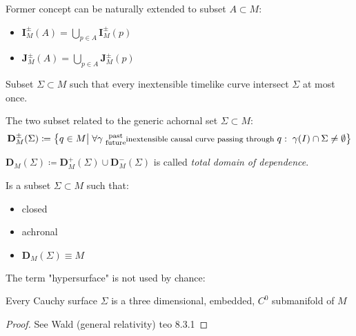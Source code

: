 \documentclass[a4paper,12pt]{scrartcl}    %
\begin{document}
	\begin{notationfix}
		Former concept can be naturally extended to subset $A \subset M$:
			\begin{itemize}
				\item $\mathbf{I}_M^\pm(A) = \bigcup_{p\in A} \mathbf{I}_M^\pm(p) $
				\item $\mathbf{J}_M^\pm(A) = \bigcup_{p\in A} \mathbf{J}_M^\pm(p) $
			\end{itemize}
	\end{notationfix}

	\begin{definition}
		Subset $\Sigma \subset M$ such that every inextensible timelike curve intersect $\Sigma$ at most once.
	\end{definition}

	\begin{definition}
		The two subset related to the generic achornal set $\Sigma \subset M$:
		\begin{displaymath}		
			\mathbf{D}_M^\pm(\Sigma) \coloneqq \big\{ q \in M \big\vert \; \forall \gamma \substack{\textrm{ past}\\ \textrm{ future} }\textrm{\footnotesize inextensible causal curve passing through }q : \; \gamma(I) \cap \Sigma \neq \emptyset  \big\}
		\end{displaymath}		
	\end{definition}

	\begin{notationfix}
		$\mathbf{D}_M(\Sigma)  \coloneqq \mathbf{D}_M^+(\Sigma) \cup \mathbf{D}_M^-(\Sigma)$ is called \emph{total domain of dependence}.
	\end{notationfix}

	\begin{definition}
		Is a subset $\Sigma \subset M$ such that:
		\begin{itemize}
			\item closed
			\item achronal
			\item $\mathbf{D}_M(\Sigma) \equiv M$
		\end{itemize}
	\end{definition}

	The term "hypersurface" is not used by chance:	
	\begin{proposition}
		Every Cauchy surface $\Sigma$ is a three dimensional, embedded, $C^0$ submanifold of $M$
	\end{proposition}
	\begin{proof}
		See Wald (general relativity) teo 8.3.1
	\end{proof}
	
\end{document}

